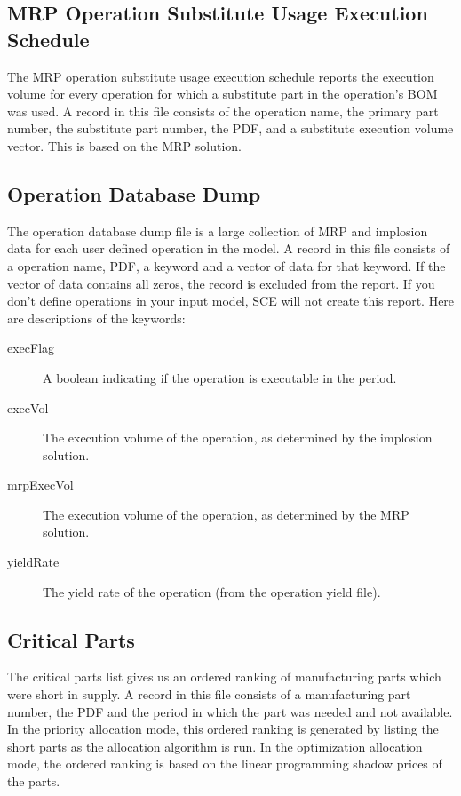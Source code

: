 \subsection{MRP Operation Substitute Usage Execution Schedule}
The MRP operation substitute usage execution schedule reports the
execution volume for every operation for which a substitute part in
the operation's BOM was used. A record in this file consists of the
operation name, the primary part number, the substitute part number,
the PDF, and a substitute execution volume vector.  This is based on the
MRP solution.

\subsection{Operation Database Dump}
The operation database dump file is a large collection of
MRP and implosion data for each user defined operation in the model.  A
record in this file consists of a operation name, PDF, a keyword and a
vector of data for that keyword.  If the vector of data contains all
zeros, the record is excluded from the report.  If you don't define
operations in your input model, SCE will not create this report.  Here
are descriptions of the keywords:

\begin{description}
\item[execFlag]
A boolean indicating if the operation is executable in the period.

\item[execVol]
The execution volume of the operation, as determined by
the implosion solution.

\item[mrpExecVol]
The execution volume of the operation, as determined by
the MRP solution.

\item[yieldRate]
The yield rate of the operation (from the operation yield file).

\end{description}

\subsection{Critical Parts}
The critical parts list gives us an ordered ranking of manufacturing
parts which were short in supply.  A record in this file consists of a
manufacturing part number, the PDF and the period in which the part
was needed and not available.  In the priority allocation mode, this
ordered ranking is generated by listing the short parts as the
allocation algorithm is run.  In the optimization allocation mode, the
ordered ranking is based on the linear programming shadow prices of
the parts.

